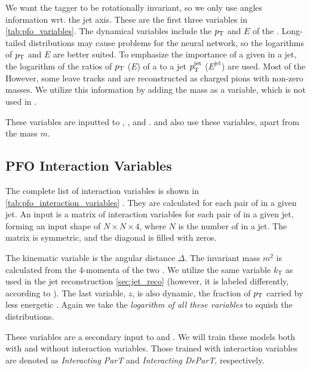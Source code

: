 We want the tagger to be rotationally invariant, so we only use angles information wrt. the jet axis.
These are the first three variables in \cref{tab:pfo_variables}.
The dynamical variables include the $p_\text{T}$ and $E$ of the \PFO.
Long-tailed distributions may cause problems for the neural network, so the logarithms of $p_\text{T}$ and $E$ are better suited. 
To emphasize the importance of a given \PFO in a jet, the logarithm of the ratios of $p_\text{T}$ ($E$) of a \PFO to a jet $p_\text{T}^\mathrm{jet}$ ($E^\mathrm{jet}$) are used.
Most of the \PFOs {}
However, some leave tracks and are reconstructed as charged pions with non-zero masses.
We utilize this information by adding the mass as a variable, which is not used in \cite{part}.

These variables are inputted to \trans, \ParT, and \depart.
\PFN and \EFN also use these variables, apart from the mass $m$.

\subsection{PFO Interaction Variables}
\label{sec:pfo_interaction_variables}

The complete list of \PFO interaction variables is shown in \cref{tab:pfo_interaction_variables} \cite{part}.
They are calculated for each pair of \PFOs in a given jet.
An input is a matrix of \PFO interaction variables for each pair of \PFOs in a given jet, forming an input shape of $N \times N \times 4$, where $N$ is the number of \PFOs in a jet.
The matrix is symmetric, and the diagonal is filled with zeros.

The kinematic variable is the angular distance $\Delta$.
The invariant mass $m^2$ is calculated from the 4-momenta of the two \PFOs.
We utilize the same variable $k_\mathrm{T}$ as used in the jet reconstruction \cref{sec:jet_reco} (however, it is labeled differently, according to \cite{part}).
The last variable, $z$, is also dynamic, the fraction of $p_\text{T}$ carried by less energetic \PFO.
Again we take the \emph{logarithm of all these variables}  to squish the distributions. 

These variables are a secondary input to \ParT and \depart.
We will train these models both with and without interaction variables.
Those trained with interaction variables are denoted as \emph{Interacting ParT} and \emph{Interacting DeParT}, respectively.

